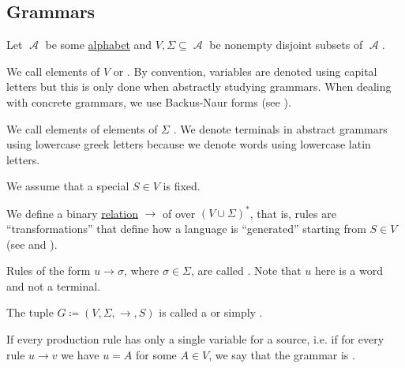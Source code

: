 \subsection{Grammars}\label{subsec:grammars}

\begin{definition}\label{def:grammar}
  Let \( \mscrA \) be some \hyperref[def:language/alphabet]{alphabet} and \( V, \Sigma \subseteq \mscrA \) be nonempty disjoint subsets of \( \mscrA \).

  \begin{thmenum}
     We call elements of \( V \)  or . By convention, variables are denoted using capital letters but this is only done when abstractly studying grammars. When dealing with concrete grammars, we use Backus-Naur forms (see ).

     We call elements of elements of \( \Sigma \) . We denote terminals in abstract grammars using lowercase greek letters because we denote words using lowercase latin letters.

     We assume that a special  \( S \in V \) is fixed.

     We define a binary \hyperref[def:relation]{relation} \( \to \) of  over \( (V \cup \Sigma)^* \), that is, rules are \enquote{transformations} that define how a language is \enquote{generated} starting from \( S \in V \) (see  and ).

     Rules of the form \( u \to \sigma \), where \( \sigma \in \Sigma \), are called . Note that \( u \) here is a word and not a terminal.

     The tuple \( G \coloneqq (V, \Sigma, \to, S) \) is called a  or simply .

     If every production rule has only a single variable for a source, i.e. if for every rule \( u \to v \) we have \( u = A \) for some \( A \in V \), we say that the grammar is .
  \end{thmenum}
\end{definition}

